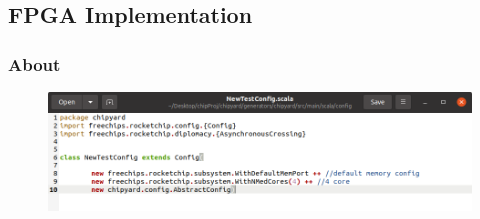 

\subsection{FPGA Implementation}\label{sec:FPGA_Implementation}


\subsubsection{About}\label{sec:About}

\begin{figure}[h!tbp]
  \centering
  \includegraphics[width=0.7\linewidth]{./NewTestConfig.png}
  \caption{}
  \label{fig:newtestconfig}
\end{figure}


